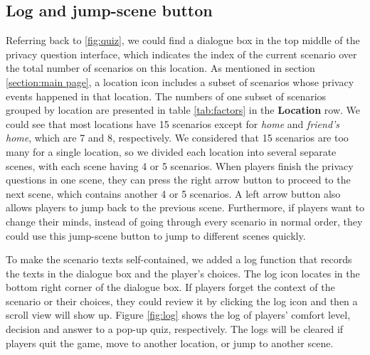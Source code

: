 \documentclass[msc,deptreport,ai]{infthesis}      %
\begin{document}
\subsection{Log and jump-scene button}
\label{section:log and jump-scene}

Referring back to \ref{fig:quiz}, we could find a dialogue box in the top middle of the privacy question interface, which indicates the index of the current scenario over the total number of scenarios on this location. As mentioned in section \ref{section:main page}, a location icon includes a subset of scenarios whose privacy events happened in that location. The numbers of one subset of scenarios grouped by location are presented in table \ref{tab:factors} in the \textbf{Location} row. We could see that most locations have 15 scenarios except for \textit{home} and \textit{friend's home}, which are 7 and 8, respectively. We considered that 15 scenarios are too many for a single location, so we divided each location into several separate scenes, with each scene having 4 or 5 scenarios. When players finish the privacy questions in one scene, they can press the right arrow button to proceed to the next scene, which contains another 4 or 5 scenarios. A left arrow button also allows players to jump back to the previous scene. Furthermore, if players want to change their minds, instead of going through every scenario in normal order, they could use this jump-scene button to jump to different scenes quickly.

To make the scenario texts self-contained, we added a log function that records the texts in the dialogue box and the player's choices. The log icon locates in the bottom right corner of the dialogue box. If players forget the context of the scenario or their choices, they could review it by clicking the log icon and then a scroll view will show up. Figure \ref{fig:log} shows the log of players' comfort level, decision and answer to a pop-up quiz, respectively. The logs will be cleared if players quit the game, move to another location, or jump to another scene.
\end{document}
